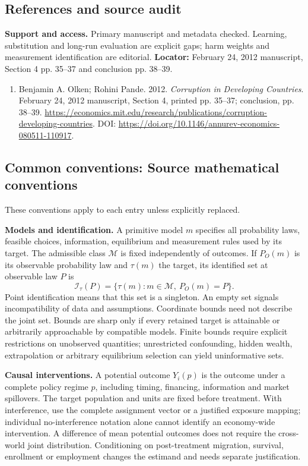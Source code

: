 \documentclass[11pt,a4paper]{article}
\begin{document}
\subsection*{References and source audit}
\textbf{Support and access.} Primary manuscript and metadata checked. Learning, substitution and long-run evaluation are explicit gaps; harm weights and measurement identification are editorial. \textbf{Locator:} February 24, 2012 manuscript, Section 4 pp. 35--37 and conclusion pp. 38--39.
\begin{enumerate}\raggedright
\item\hypertarget{definitions:source:30007665:1}{} Benjamin A. Olken; Rohini Pande. 2012. \emph{Corruption in Developing Countries}. February 24, 2012 manuscript, Section 4, printed pp. 35--37; conclusion, pp. 38--39.
\url{https://economics.mit.edu/research/publications/corruption-developing-countries}.
DOI: \url{https://doi.org/10.1146/annurev-economics-080511-110917}.
\end{enumerate}

\subsection*{Common conventions: Source mathematical conventions}

These conventions apply to each entry unless explicitly replaced.

\textbf{Models and identification.} A primitive model \(m\) specifies all probability laws, feasible choices, information, equilibrium and measurement rules used by its target. The admissible class \(\mathcal M\) is fixed independently of outcomes. If \(P_O(m)\) is its observable probability law and \(\tau(m)\) the target, its identified set at observable law \(P\) is
\[
 \mathcal I_\tau(P)=\{\tau(m):m\in\mathcal M,\ P_O(m)=P\}.
\]
Point identification means that this set is a singleton. An empty set signals incompatibility of data and assumptions. Coordinate bounds need not describe the joint set. Bounds are sharp only if every retained target is attainable or arbitrarily approachable by compatible models. Finite bounds require explicit restrictions on unobserved quantities; unrestricted confounding, hidden wealth, extrapolation or arbitrary equilibrium selection can yield uninformative sets.

\textbf{Causal interventions.} A potential outcome \(Y_i(p)\) is the outcome under a complete policy regime \(p\), including timing, financing, information and market spillovers. The target population and units are fixed before treatment. With interference, use the complete assignment vector or a justified exposure mapping; individual no-interference notation alone cannot identify an economy-wide intervention. A difference of mean potential outcomes does not require the cross-world joint distribution. Conditioning on post-treatment migration, survival, enrollment or employment changes the estimand and needs separate justification.
\end{document}

